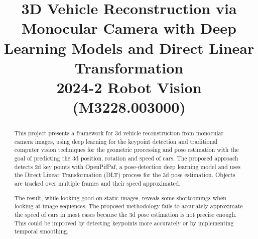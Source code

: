 \documentclass[conference]{IEEEtran}
\begin{document}
\setcounter{MaxMatrixCols}{20}
\pagestyle{plain}


\title{3D Vehicle Reconstruction via Monocular Camera with Deep Learning Models and Direct Linear Transformation\\
{\footnotesize 2024-2 Robot Vision (M3228.003000)}
}

\author{
    \and
    \and
}

\maketitle

\begin{abstract}
    This project presents a framework for 3d vehicle reconstruction from monocular camera images, using deep learning for the keypoint detection and traditional computer vision techniques for the geometric processing and pose estimation with the goal of predicting the 3d position, rotation and speed of cars. The proposed approach detects 2d key points with OpenPifPaf, a pose-detection deep learning model and uses the Direct Linear Transformation (DLT) process for the 3d pose estimation. Objects are tracked over multiple frames and their speed approximated. 
    
    The result, while looking good on static images, reveals some shortcomings when looking at image sequences. The proposed methodology fails to accurately approximate the speed of cars in most cases because the 3d pose estimation is not precise enough. This could be improved by detecting keypoints more accurately or by implementing temporal smoothing.     
\end{abstract}
\end{document}

